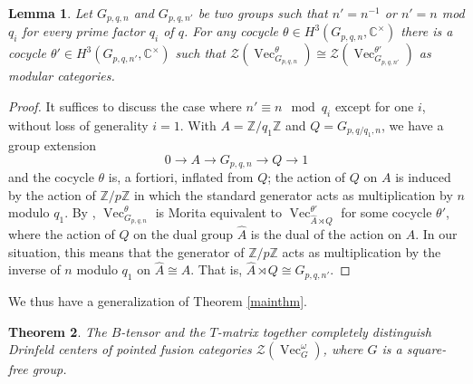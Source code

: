 \documentclass[a4paper, 10pt]{book}
\newtheorem{theorem}{Theorem}[chapter]
\newtheorem{Lem}[theorem]{Lemma}
\theoremstyle{definition}
\numberwithin{equation}{chapter}
\newcommand\inv{^{-1}}
\newcommand\Vect{\operatorname{Vec}}
\newcommand\CC{\mathbb C}
\newcommand\ZZ{\mathbb Z}
\newcommand\CCu{\CC^\times}
\newcommand\CTR{\mathcal Z}
\newcommand\semdir{\rtimes}
\begin{document}
\begin{Lem}
Let $G_{p,q,n}$ and $G_{p,q,n'}$ be two groups such that $n'=n\inv$ or $n'=n$ mod $q_i$ for every prime factor $q_i$ of $q$. For any cocycle $\theta\in H^3(G_{p,q,n},\CCu)$ there is a cocycle $\theta'\in H^3(G_{p,q,n'},\CCu)$ such that $\CTR(\Vect_{G_{p,q,n}}^\theta)\cong\CTR(\Vect_{G_{p,q,n'}}^{\theta'})$ as modular categories.
\end{Lem}
\begin{proof}
  It suffices to discuss the case where $n'\equiv n\mod q_i$ except for one $i$, without loss of generality $i=1$. With $A=\ZZ/q_1\ZZ$ and $Q=G_{p,q/q_1,n}$, we have a group extension
  \begin{equation*}
    0\rightarrow A\rightarrow G_{p,q,n}\rightarrow Q\rightarrow 1
  \end{equation*}
  and the cocycle $\theta$ is, a fortiori, inflated from $Q$; the action of $Q$ on $A$ is induced by the action of $\ZZ/p\ZZ$ in which the standard generator acts as multiplication by $n$ modulo $q_1$. By \cite{MR2333187}, $\Vect_{G_{p,q,n}}^\theta$ is Morita equivalent to $\Vect_{\hat A\semdir Q}^{\theta'}$ for some cocycle $\theta'$, where the action of $Q$ on the dual group $\hat A$ is the dual of the action on $A$. In our situation, this means that the generator of $\ZZ/p\ZZ$ acts as multiplication by the inverse of $n$ modulo $q_1$ on $\hat A\cong A$. That is, $\hat A\semdir Q\cong G_{p,q,n'}$.
\end{proof}
We thus have a generalization of Theorem \ref{mainthm}.
\begin{theorem}\label{thm:BT}
The $B$-tensor and the $T$-matrix together completely distinguish Drinfeld centers of pointed fusion categories $\CTR(\Vect_G^\omega)$, where $G$ is a square-free group. 
\end{theorem}
\end{document}
